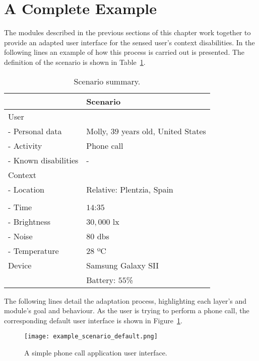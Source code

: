 \section{A Complete Example}
\label{sec:complete_example}

The modules described in the previous sections of this chapter work together to
provide an adapted user interface for the sensed user's context disabilities. 
In the following lines an example of how this process is carried out is 
presented. The definition of the scenario is shown in Table~\ref{tbl:example_scenario}.

\begin{table}[H]
 \caption{Scenario summary.}
 \label{tbl:example_scenario}
 \footnotesize
 \centering
\begin{tabular}{l l}
  \hline 
				& \textbf{Scenario}		\\
  \hline
  User \\
  \qquad - Personal data 	& Molly, $39$ years old, United States\\
  \qquad - Activity	 	& Phone call			\\
  \qquad - Known disabilities 	& - 				\\
  Context \\
  \qquad - Location 		& Relative: Plentzia, Spain  	\\
				& 				\\
  \qquad - Time			& $14$:$35$ 			\\
  \qquad - Brightness		& $30,000$ \ac{lx}		\\
  \qquad - Noise		& $80$ \acp{db}			\\
  \qquad - Temperature		& $28$ ºC 			\\
  Device 			& Samsung Galaxy SII 	 	\\
				& Battery: $55$\%		\\
  \hline
\end{tabular}
\end{table}

The following lines detail the adaptation process, highlighting each layer's and
module's goal and behaviour. As the user is trying to perform a phone call, the 
corresponding default user interface is shown in Figure~\ref{fig:example_scenario_default}.

\begin{figure}[H]
\centering
\texttt{[image: example\_scenario\_default.png]}
\caption{A simple phone call application user interface.}
\label{fig:example_scenario_default}
\end{figure}

